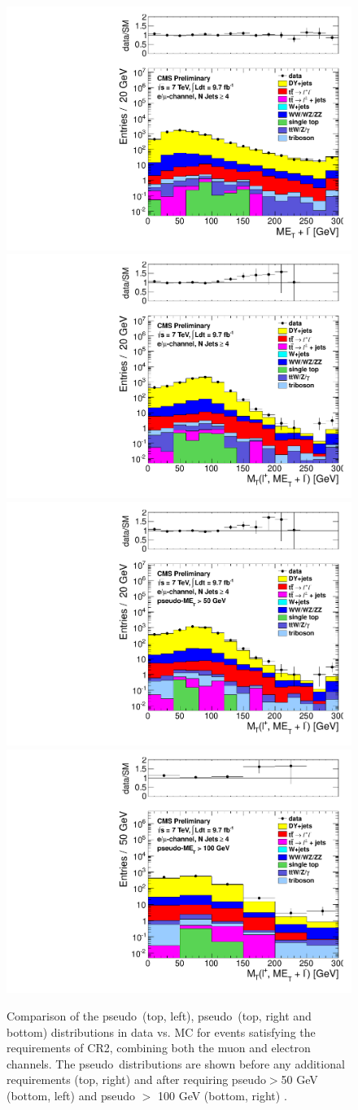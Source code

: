 \begin{figure}[hbt]
  \begin{center}
	\includegraphics[width=0.5\linewidth]{plots/CR2plots/met_lepcor_scaled_nj4_emucomb.pdf}%
	\includegraphics[width=0.5\linewidth]{plots/CR2plots/mt_lepcor_scaled_nj4_emucomb.pdf}
	\includegraphics[width=0.5\linewidth]{plots/CR2plots/mt_lepcor_scaled_met50_nj4_emucomb.pdf}%
	\includegraphics[width=0.5\linewidth]{plots/CR2plots/mt_lepcor_scaled_met100_nj4_emucomb.pdf}

    \caption{
      Comparison of the pseudo\-\met\ (top, left), pseudo\-\mt\ (top,
      right and bottom) distributions in data vs. MC for events
      satisfying the requirements of CR2, combining both the muon and
      electron channels. The pseudo\-\mt\ distributions are shown
      before any additional requirements (top, right) and after
      requiring pseudo\-\met $>$50 GeV (bottom, left) and pseudo\-\met
      $>$ 100 GeV (bottom, right) .
\label{fig:cr2met} 
}  
      \end{center}
\end{figure}

